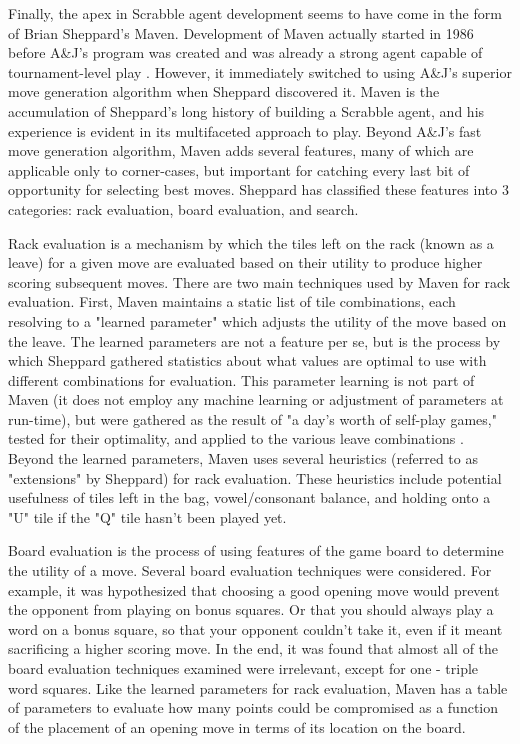 \documentclass[letterpaper]{article}
\begin{document}
Finally, the apex in Scrabble agent development seems to have come in the form of Brian Sheppard's Maven. Development of Maven actually started in 1986 before A\&J's program was created and was already a strong agent capable of tournament-level play \cite{Schaeffer2001}. However, it immediately switched to using A\&J's superior move generation algorithm when Sheppard discovered it. Maven is the accumulation of Sheppard's long history of building a Scrabble agent, and his experience is evident in its multifaceted approach to play. Beyond A\&J's fast move generation algorithm, Maven adds several features, many of which are applicable only to corner-cases, but important for catching every last bit of opportunity for selecting best moves. Sheppard has classified these features into 3 categories: rack evaluation, board evaluation, and search. 

Rack evaluation is a mechanism by which the tiles left on the rack (known as a leave) for a given move are evaluated based on their utility to produce higher scoring subsequent moves. There are two main techniques used by Maven for rack evaluation. First, Maven maintains a static list of tile combinations, each resolving to a "learned parameter" which adjusts the utility of the move based on the leave. The learned parameters are not a feature per se, but is the process by which Sheppard gathered statistics about what values are optimal to use with different combinations for evaluation. This parameter learning is not part of Maven (it does not employ any machine learning or adjustment of parameters at run-time), but were gathered as the result of "a day's worth of self-play games," tested for their optimality, and applied to the various leave combinations \cite{1sheppard2002}. Beyond the learned parameters, Maven uses several heuristics (referred to as "extensions" by Sheppard) for rack evaluation. These heuristics include potential usefulness of tiles left in the bag, vowel/consonant balance, and holding onto a "U" tile if the "Q" tile hasn't been played yet.

Board evaluation is the process of using features of the game board to determine the utility of a move. Several board evaluation techniques were considered. For example, it was hypothesized that choosing a good opening move would prevent the opponent from playing on bonus squares. Or that you should always play a word on a bonus square, so that your opponent couldn't take it, even if it meant sacrificing a higher scoring move. In the end, it was found that almost all of the board evaluation techniques examined were irrelevant, except for one - triple word squares. Like the learned parameters for rack evaluation, Maven has a table of parameters to evaluate how many points could be compromised as a function of the placement of an opening move in terms of its location on the board.
\end{document}
